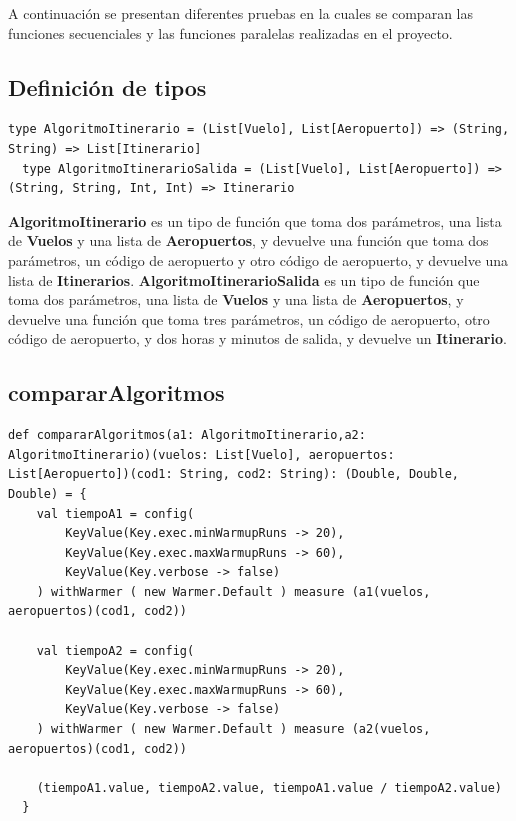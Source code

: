 \documentclass[letterpaper]{article}
\begin{document}
A continuación se presentan diferentes pruebas en la cuales
se comparan las funciones secuenciales y las funciones paralelas realizadas en el proyecto.

\subsection{Definición de tipos}

\begin{lstlisting}[caption={Definición de los tipos de datos}, label={lst:tipos}, captionpos=b]
  type AlgoritmoItinerario = (List[Vuelo], List[Aeropuerto]) => (String, String) => List[Itinerario]
  type AlgoritmoItinerarioSalida = (List[Vuelo], List[Aeropuerto]) => (String, String, Int, Int) => Itinerario
\end{lstlisting}

\textbf{AlgoritmoItinerario} es un tipo de función que toma dos parámetros, una lista de \textbf{Vuelos} y una lista de \textbf{Aeropuertos}, y devuelve una función que toma dos parámetros, un código de aeropuerto y otro 
código de aeropuerto, y devuelve una lista de \textbf{Itinerarios}.
\textbf{AlgoritmoItinerarioSalida} es un tipo de función que toma dos parámetros, una lista de \textbf{Vuelos} y una lista de \textbf{Aeropuertos}, y devuelve una función que toma tres parámetros, un código de aeropuerto, otro código de aeropuerto, 
y dos horas y minutos de salida, y devuelve un \textbf{Itinerario}.

\subsection{compararAlgoritmos}
\begin{lstlisting}[caption={Función para comparar los algoritmos}, label={lst:compararAlgoritmos}, captionpos=b]
  def compararAlgoritmos(a1: AlgoritmoItinerario,a2: AlgoritmoItinerario)(vuelos: List[Vuelo], aeropuertos: List[Aeropuerto])(cod1: String, cod2: String): (Double, Double, Double) = {
    val tiempoA1 = config(
        KeyValue(Key.exec.minWarmupRuns -> 20),
        KeyValue(Key.exec.maxWarmupRuns -> 60),
        KeyValue(Key.verbose -> false)
    ) withWarmer ( new Warmer.Default ) measure (a1(vuelos, aeropuertos)(cod1, cod2))

    val tiempoA2 = config(
        KeyValue(Key.exec.minWarmupRuns -> 20),
        KeyValue(Key.exec.maxWarmupRuns -> 60),
        KeyValue(Key.verbose -> false)
    ) withWarmer ( new Warmer.Default ) measure (a2(vuelos, aeropuertos)(cod1, cod2))

    (tiempoA1.value, tiempoA2.value, tiempoA1.value / tiempoA2.value)
  }
\end{lstlisting}
\end{document}
